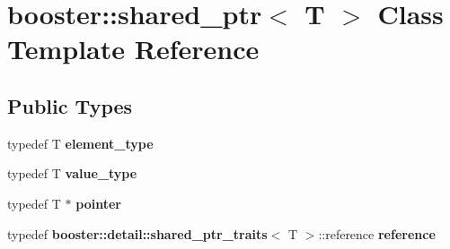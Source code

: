 \section{booster\+:\+:shared\+\_\+ptr$<$ T $>$ Class Template Reference}
\label{classbooster_1_1shared__ptr}
\subsection*{Public Types}
\begin{DoxyCompactItemize}
\item 
typedef T {\bfseries element\+\_\+type}\label{classbooster_1_1shared__ptr_a39185bbbcb2b45c05078b172aba40d18}

\item 
typedef T {\bfseries value\+\_\+type}\label{classbooster_1_1shared__ptr_a4e47f9bb1d99914dae9c423decd5b212}

\item 
typedef T $\ast$ {\bfseries pointer}\label{classbooster_1_1shared__ptr_aacdf919530faee7137bd7316c09b7858}

\item 
typedef {\bf booster\+::detail\+::shared\+\_\+ptr\+\_\+traits}$<$ T $>$\+::reference {\bfseries reference}\label{classbooster_1_1shared__ptr_af6612466646e048e063db10122e48099}

\end{DoxyCompactItemize}
